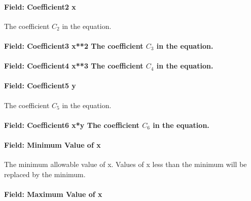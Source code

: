 \paragraph{Field: Coefficient2 x}\label{field-coefficient2-x-6}

The coefficient \(C_2\) in the equation.

\paragraph{\texorpdfstring{Field: Coefficient3 x**2 The coefficient \(C_3\) in the equation.}{Field: Coefficient3 x**2 The coefficient C\_3 in the equation.}}\label{field-coefficient3-x2-the-coefficient-cux5f3-in-the-equation.}

\paragraph{\texorpdfstring{Field: Coefficient4 x**3 The coefficient \(C_4\) in the equation.}{Field: Coefficient4 x**3 The coefficient C\_4 in the equation.}}\label{field-coefficient4-x3-the-coefficient-cux5f4-in-the-equation.}

\paragraph{Field: Coefficient5 y}\label{field-coefficient5-y}

The coefficient \(C_5\) in the equation.

\paragraph{\texorpdfstring{Field: Coefficient6 x*y The coefficient \(C_6\) in the equation.}{Field: Coefficient6 x*y The coefficient C\_6 in the equation.}}\label{field-coefficient6-xy-the-coefficient-cux5f6-in-the-equation.}

\paragraph{Field: Minimum Value of x}\label{field-minimum-value-of-x-8}

The minimum allowable value of x. Values of x less than the minimum will be replaced by the minimum.

\paragraph{Field: Maximum Value of x}\label{field-maximum-value-of-x-9}

